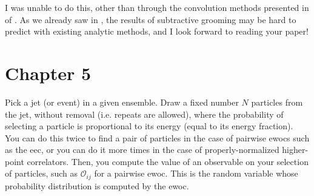 
I was unable to do this, other than through the convolution methods presented in  of .
%
As we already saw in , the results of subtractive grooming may be hard to predict with existing analytic methods, and I look forward to reading your paper!



\section*{Chapter 5}

Pick a jet (or event) in a given ensemble.
%
Draw a fixed number \(N\) particles from the jet, without removal (i.e. repeats are allowed), where the probability of selecting a particle is proportional to its energy (equal to its energy fraction).
%
You can do this twice to find a pair of particles in the case of pairwise \glspl{ewoc} such as the \gls{eec}, or you can do it more times in the case of properly-normalized higher-point correlators.
%
Then, you compute the value of an observable on your selection of particles, such as \(\mathcal{O}_{ij}\) for a pairwise \gls{ewoc}.
%
This is the random variable whose probability distribution is computed by the \gls{ewoc}.




